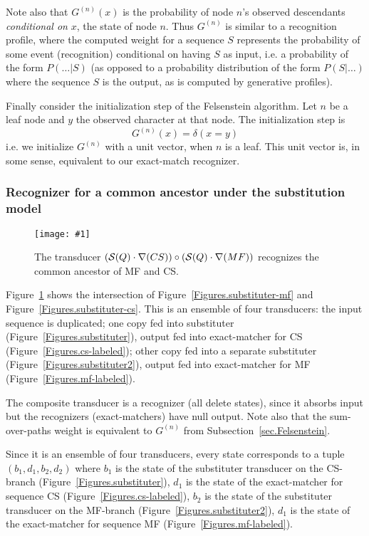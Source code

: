 \documentclass{article}
\newcommand{\secref}[1]{Subsection~\ref{sec.#1}}
\newcommand{\seclabel}[1]{\label{sec.#1}}
\newcommand{\figref}[1]{Figure~\ref{Figures.#1}}
\newcommand{\figlabel}[1]{\label{Figures.#1}}
\newcommand{\easyfig}[4]{
\begin{figure}
\texttt{[image: \#1]}
\caption{ \figlabel{#3} #4}
\end{figure}}
\newcommand{\pdffig}[2]{\easyfig{#1-fig.pdf}{}{#1}{#2}}
\newcommand\substitute{{\cal S}}
\newcommand\fork{\circ}
\newcommand\recognize{\nabla}
\begin{document}
Note also that $G^{(n)}(x)$ is the probability of node $n$'s observed descendants
{\em conditional on} $x$, the state of node $n$.
Thus $G^{(n)}$ is similar to a recognition profile,
where the computed weight for a sequence $S$ represents
the probability of some event (recognition) conditional on having $S$ as input,
i.e. a probability of the form $P(\ldots|S)$
(as opposed to a probability distribution of the form $P(S|\ldots)$ where the sequence $S$ is the output,
as is computed by generative profiles).

Finally consider the initialization step of the Felsenstein algorithm.
Let $n$ be a leaf node and $y$ the observed character at that node.
The initialization step is
\[
G^{(n)}(x) = \delta(x=y)
\]
i.e. we initialize $G^{(n)}$ with a unit vector, when $n$ is a leaf.
This unit vector is, in some sense, equivalent to our exact-match recognizer.

\subsubsection{Recognizer for a common ancestor under the substitution model}
\seclabel{fork-subcs-submf}

\pdffig{fork-subcs-submf}{The transducer $(\substitute(Q) \cdot \recognize(CS))\fork(\substitute(Q) \cdot \recognize(MF))$  recognizes the common ancestor of MF and CS.}

\figref{fork-subcs-submf} shows the intersection of \figref{substituter-mf} and \figref{substituter-cs}.  
This is an ensemble of four transducers:
the input sequence is duplicated;
one copy fed into substituter (\figref{substituter}),
output fed into exact-matcher for CS (\figref{cs-labeled});
other copy fed into a separate substituter (\figref{substituter2}),
output fed into exact-matcher for MF (\figref{mf-labeled}).

The composite transducer is a recognizer (all delete states), since it absorbs input 
but the recognizers (exact-matchers) have null output.  
Note also that the sum-over-paths weight is equivalent to $G^{(n)}$ from \secref{Felsenstein}.


Since it is an ensemble of four transducers, every state corresponds to a tuple $(b_1,d_1,b_2,d_2)$
where
$b_1$ is the state of the substituter transducer on the CS-branch (\figref{substituter}),
$d_1$ is the state of the exact-matcher for sequence CS (\figref{cs-labeled}),
$b_2$ is the state of the substituter transducer on the MF-branch (\figref{substituter2}),
$d_1$ is the state of the exact-matcher for sequence MF (\figref{mf-labeled}).
\end{document}
